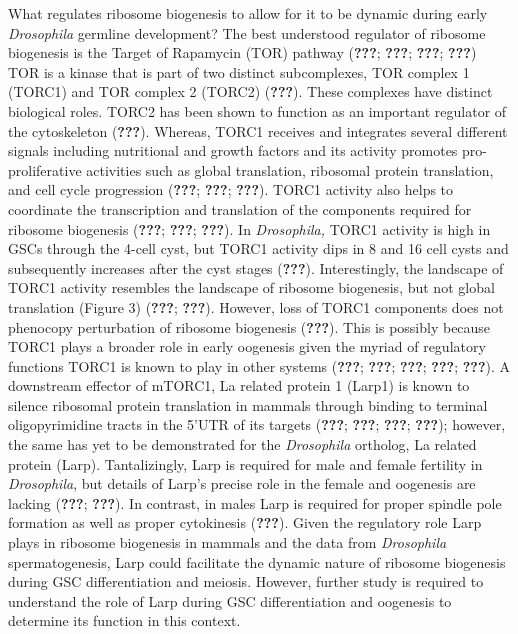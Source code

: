 \documentclass[12pt,oneside]{reedthesis}
\begin{document}
What regulates ribosome biogenesis to allow for it to be dynamic during
early \emph{Drosophila} germline development? The best understood regulator
of ribosome biogenesis is the Target of Rapamycin (TOR) pathway
({\textbf{???}}; {\textbf{???}}; {\textbf{???}}; {\textbf{???}})
TOR is a kinase that is part of two distinct subcomplexes, TOR complex 1
(TORC1) and TOR complex 2 (TORC2) ({\textbf{???}}). These
complexes have distinct biological roles. TORC2 has been shown to
function as an important regulator of the cytoskeleton
({\textbf{???}}). Whereas, TORC1 receives and integrates several
different signals including nutritional and growth factors and its
activity promotes pro-proliferative activities such as global
translation, ribosomal protein translation, and cell cycle progression
({\textbf{???}}; {\textbf{???}}; {\textbf{???}}). TORC1 activity also helps
to coordinate the transcription and translation of the components
required for ribosome biogenesis ({\textbf{???}}; {\textbf{???}}; {\textbf{???}}). In \emph{Drosophila,} TORC1 activity is high in GSCs through
the 4-cell cyst, but TORC1 activity dips in 8 and 16 cell cysts and
subsequently increases after the cyst stages ({\textbf{???}}).
Interestingly, the landscape of TORC1 activity resembles the landscape
of ribosome biogenesis, but not global translation (Figure 3)
({\textbf{???}}; {\textbf{???}}). However, loss of TORC1 components does
not phenocopy perturbation of ribosome biogenesis ({\textbf{???}}).
This is possibly because TORC1 plays a broader role in early oogenesis
given the myriad of regulatory functions TORC1 is known to play in other
systems ({\textbf{???}}; {\textbf{???}}; {\textbf{???}}; {\textbf{???}}; {\textbf{???}}). A downstream effector of mTORC1, La related protein 1
(Larp1) is known to silence ribosomal protein translation in mammals
through binding to terminal oligopyrimidine tracts in the 5'UTR of its
targets ({\textbf{???}}; {\textbf{???}}; {\textbf{???}}; {\textbf{???}}); however, the same has yet to be
demonstrated for the \emph{Drosophila} ortholog, La related protein (Larp).
Tantalizingly, Larp is required for male and female fertility in
\emph{Drosophila}, but details of Larp's precise role in the female and
oogenesis are lacking ({\textbf{???}}; {\textbf{???}}). In contrast,
in males Larp is required for proper spindle pole formation as well as
proper cytokinesis ({\textbf{???}}). Given the regulatory role Larp
plays in ribosome biogenesis in mammals and the data from \emph{Drosophila}
spermatogenesis, Larp could facilitate the dynamic nature of ribosome
biogenesis during GSC differentiation and meiosis. However, further
study is required to understand the role of Larp during GSC
differentiation and oogenesis to determine its function in this context.
\end{document}
